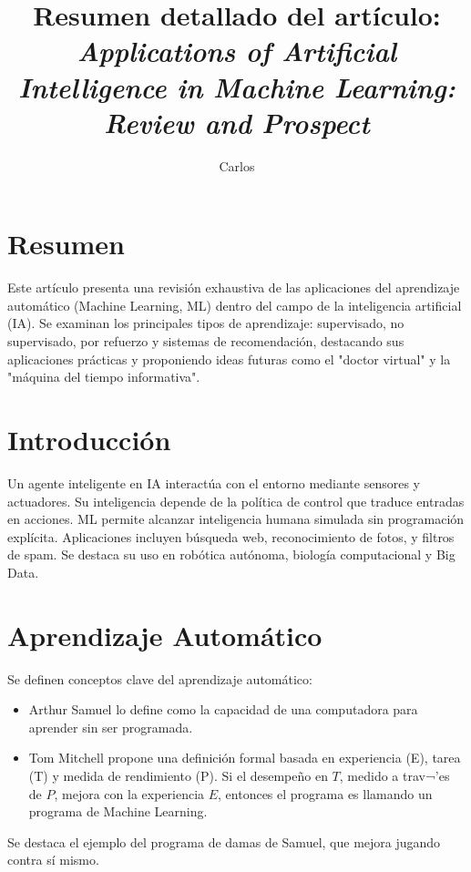 \documentclass[12pt]{article}
\title{Resumen detallado del art\'iculo:\\
\textit{Applications of Artificial Intelligence in Machine Learning: Review and Prospect}}
\author{Carlos}
\date{}
\begin{document}
\maketitle

\section*{Resumen}
Este art\'iculo presenta una revisi\'on exhaustiva de las aplicaciones del aprendizaje autom\'atico (Machine Learning, ML) dentro del campo de la inteligencia artificial (IA). Se examinan los principales tipos de aprendizaje: supervisado, no supervisado, por refuerzo y sistemas de recomendaci\'on, destacando sus aplicaciones pr\'acticas y proponiendo ideas futuras como el "doctor virtual" y la "m\'aquina del tiempo informativa".

\section{Introducci\'on}
Un agente inteligente en IA interact\'ua con el entorno mediante sensores y actuadores. Su inteligencia depende de la pol\'itica de control que traduce entradas en acciones. ML permite alcanzar inteligencia humana simulada sin programaci\'on expl\'icita. Aplicaciones incluyen b\'usqueda web, reconocimiento de fotos, y filtros de spam. Se destaca su uso en rob\'otica aut\'onoma, biolog\'ia computacional y Big Data.

\section{Aprendizaje Autom\'atico}
Se definen conceptos clave del aprendizaje autom\'atico:
\begin{itemize}
  \item Arthur Samuel lo define como la capacidad de una computadora para aprender sin ser programada.
  \item Tom Mitchell propone una definici\'on formal basada en experiencia (E), tarea (T) y medida de rendimiento (P). Si el desempe\~no en $T$, medido a trav¬'es de $P$, mejora con la experiencia  $E$, entonces el programa es llamando un programa de Machine Learning.
\end{itemize}
Se destaca el ejemplo del programa de damas de Samuel, que mejora jugando contra s\'i mismo.
\end{document}
